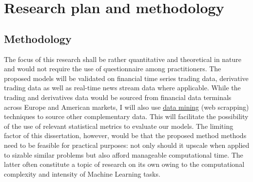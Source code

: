 \documentclass[a4paper,11pt]{scrartcl}
\newcommand{\reffig}[1]{Figure~\ref{#1}}
\begin{document}
%
\section{Research plan and methodology}
\subsection{Methodology}
The focus of this research shall be rather quantitative and theoretical in nature and would not require the use of questionnaire among practitioners.  The proposed models will be validated on financial time series trading data, derivative trading data as well as real-time news stream data where applicable. While the trading and derivatives data would be sourced from financial data terminals across Europe and American markets, I will also use \hyperlink{https://github.com/odunayo12/web-crawl}{data mining} (web scrapping) techniques to source other complementary data. This will facilitate the possibility of the use of relevant statistical metrics to evaluate our models. The limiting factor of this dissertation, however, would be that the proposed method methods need to be feasible for practical purposes: not only should it upscale when applied to sizable similar problems but also afford manageable computational time. The latter often constitute a topic of research on its own owing to the computational complexity and intensity of Machine Learning tasks.

%

\end{document}
